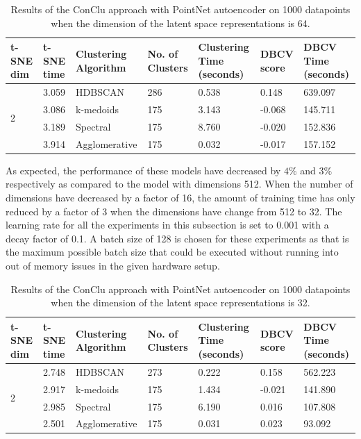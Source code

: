 \begin{table}[H]
  \setlength\extrarowheight{10pt}
  \caption{Results of the ConClu approach with PointNet autoencoder on 1000 datapoints when the dimension of the latent space representations is 64. }
  \centering
  \begin{tabular}{|p{30pt}|p{50pt}|p{60pt}|p{50pt}|p{50pt}|p{50pt}|p{40pt}|}
    \toprule
    \ac{t-SNE} dim	& \ac{t-SNE} time & Clustering Algorithm & No. of Clusters & Clustering Time (seconds) & \ac{DBCV} score & \ac{DBCV} Time (seconds)\\
    \midrule
    \multirow{4}{30pt}{2}	& 3.059 & \ac{HDBSCAN}	& 286	& 0.538 & 0.148 	& 639.097 \\ \cline{2-7} 
    & 3.086 & k-medoids	& 175	& 3.143 & -0.068	& 145.711 \\ \cline{2-7} 
    & 3.189 & Spectral	& 175	& 8.760 & -0.020	& 152.836 \\ \cline{2-7}
    & 3.914 & Agglomerative	& 175	& 0.032 & -0.017	& 157.152 \\ 
    \bottomrule
  \end{tabular}
  \label{tab:conclu_64}
\end{table}

As expected, the performance of these models have decreased by $4\%$ and $3\%$ respectively as compared to the model with dimensions 512. When the number of dimensions have decreased by a factor of 16, the amount of training time has only reduced by a factor of 3 when the dimensions have change from 512 to 32. The learning rate for all the experiments in this subsection is set to 0.001 with a decay factor of 0.1. A batch size of 128 is chosen for these experiments as that is the maximum possible batch size that could be executed without running into out of memory issues in the given hardware setup. 

\begin{table}[H]
  \setlength\extrarowheight{10pt}
  \caption{Results of the ConClu approach with PointNet autoencoder on 1000 datapoints when the dimension of the latent space representations is 32. }
  \centering
  \begin{tabular}{|p{30pt}|p{50pt}|p{60pt}|p{50pt}|p{50pt}|p{50pt}|p{40pt}|}
    \toprule
    \ac{t-SNE} dim	& \ac{t-SNE} time & Clustering Algorithm & No. of Clusters & Clustering Time (seconds) & \ac{DBCV} score & \ac{DBCV} Time (seconds)\\
    \midrule
    \multirow{4}{30pt}{2}	& 2.748 & \ac{HDBSCAN}	& 273	& 0.222 & 0.158	& 562.223 \\ \cline{2-7} 
    & 2.917 & k-medoids	& 175	& 1.434 & -0.021	& 141.890 \\ \cline{2-7} 
    & 2.985 & Spectral	& 175	& 6.190 & 0.016	& 107.808 \\ \cline{2-7}
    & 2.501 & Agglomerative	& 175	& 0.031 & 0.023	& 93.092 \\ 
    \bottomrule
  \end{tabular}
  \label{tab:conclu_32}
\end{table}

